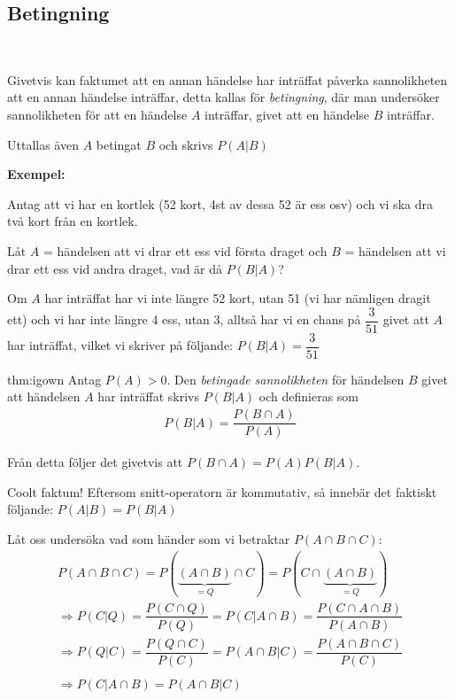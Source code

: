\subsection{Betingning}\hfill\\\par
\noindent Givetvis kan faktumet att en annan händelse har inträffat påverka sannolikheten att en annan händelse inträffar, detta kallas för \textit{betingning}, där man undersöker sannolikheten för att en händelse $A$ inträffar, givet att en händelse $B$ inträffar.\par
\noindent Uttallas även $A$ betingat $B$ och skrivs $P(A|B)$
\par\bigskip
\noindent\textbf{Exempel:}\par
\noindent Antag att vi har en kortlek (52 kort, 4st av dessa 52 är ess osv) och vi ska dra två kort från en kortlek. \par
\noindent Låt $A$ = händelsen att vi drar ett ess vid första draget och $B$ = händelsen att vi drar ett ess vid andra draget, vad är då $P(B|A)$?
\par\bigskip
\noindent Om $A$ har inträffat har vi inte längre 52 kort, utan 51 (vi har nämligen dragit ett) och vi har inte längre 4 ess, utan 3, alltså har vi en chans på $\dfrac{3}{51}$ givet att $A$ har inträffat, vilket vi skriver på följande: $P(B|A) = \dfrac{3}{51}$
\par\bigskip
\begin{theo}{thm:igown}
  Antag $P(A)>0$. Den \textit{betingade sannolikheten} för händelsen $B$ givet att händelsen $A$ har inträffat skrivs $P(B|A)$ och definieras som
  \begin{equation*}
    \begin{gathered}
      P(B|A) = \dfrac{P(B\cap A)}{P(A)}
    \end{gathered}
  \end{equation*}
\end{theo}
\par\bigskip
\noindent Från detta följer det givetvis att $P(B\cap A) = P(A)P(B|A)$.\par
\noindent Coolt faktum! Eftersom snitt-operatorn är kommutativ, så innebär det faktiskt följande: $P(A|B) = P(B|A)$
\par\bigskip
\noindent Låt oss undersöka vad som händer som vi betraktar $P(A\cap B\cap C)$:
\begin{equation*}
  \begin{gathered}
    P(A\cap B\cap C) = P(\underbrace{(A\cap B)}_{\text{$=Q$}}\cap C) = P(C\cap\underbrace{(A\cap B)}_{\text{$=Q$}})\\
    \Rightarrow P(C|Q) = \dfrac{P(C\cap Q)}{P(Q)} = P(C|A\cap B) = \dfrac{P(C\cap A\cap B)}{P(A\cap B)}\\
    \Rightarrow P(Q|C) = \dfrac{P(Q\cap C)}{P(C)} = P(A\cap B|C) = \dfrac{P(A\cap B\cap C)}{P(C)}\\\\
    \Rightarrow P(C|A\cap B) = P(A\cap B|C)
  \end{gathered}
\end{equation*}
\par\bigskip
